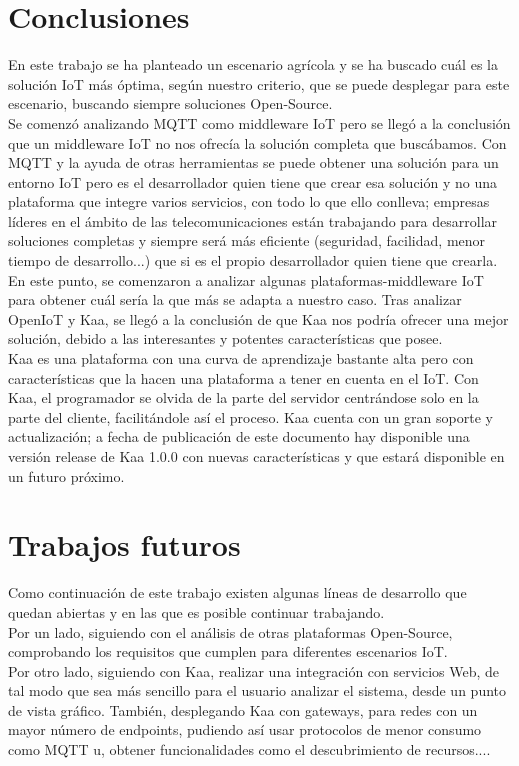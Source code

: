 \documentclass[12pt, twoside]{book}
\begin{document}
\section{Conclusiones}
En este trabajo se ha planteado un escenario agrícola y se ha buscado cuál es la solución IoT más óptima, según nuestro criterio, que se puede desplegar para este escenario, buscando siempre soluciones Open-Source.\\
Se comenzó analizando MQTT como middleware IoT pero se llegó a la conclusión que un middleware IoT no nos ofrecía la solución completa que buscábamos. Con MQTT y la ayuda de otras herramientas se puede obtener una solución para un entorno IoT pero es el desarrollador quien tiene que crear esa solución y no una plataforma que integre varios servicios, con todo lo que ello conlleva; empresas líderes en el ámbito de las telecomunicaciones están trabajando para desarrollar soluciones completas y siempre será más eficiente (seguridad, facilidad, menor tiempo de desarrollo...) que si es el propio desarrollador quien tiene que crearla.\\En este punto, se comenzaron a analizar algunas plataformas-middleware IoT para obtener cuál sería la que más se adapta a nuestro caso. Tras analizar OpenIoT y Kaa, se llegó a la conclusión de que Kaa nos podría ofrecer una mejor solución, debido a las interesantes y potentes características que posee.\\ 

Kaa es una plataforma con una curva de aprendizaje bastante alta pero con características que la hacen una plataforma a tener en cuenta en el IoT. Con Kaa, el programador se olvida de la parte del servidor centrándose solo  en la parte del cliente, facilitándole así el proceso. Kaa cuenta con un gran soporte y actualización; a fecha de publicación de este documento hay disponible una versión release de Kaa 1.0.0 con nuevas características y que estará disponible en un futuro próximo.
\section{Trabajos futuros}
Como continuación de este trabajo existen algunas líneas de desarrollo que quedan abiertas y en las que es posible continuar trabajando. \\
Por un lado, siguiendo con el análisis de otras plataformas Open-Source, comprobando los requisitos que cumplen para diferentes escenarios IoT.\\Por otro lado, siguiendo con Kaa,  realizar una integración con servicios Web, de tal modo que sea más sencillo para el usuario analizar el sistema, desde un punto de vista gráfico. También, desplegando Kaa con gateways, para redes con un mayor número de endpoints, pudiendo así usar protocolos de menor consumo como MQTT u, obtener funcionalidades como el descubrimiento de recursos....
\end{document}
